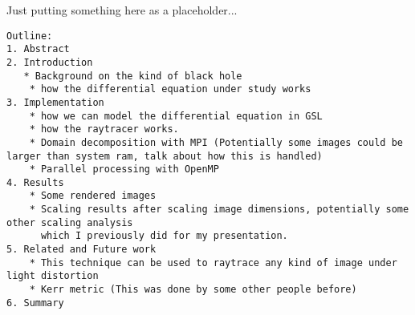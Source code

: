 Just putting something here as a placeholder...

\begin{verbatim}
Outline:
1. Abstract
2. Introduction
   * Background on the kind of black hole
    * how the differential equation under study works
3. Implementation
    * how we can model the differential equation in GSL
    * how the raytracer works.
    * Domain decomposition with MPI (Potentially some images could be larger than system ram, talk about how this is handled)
    * Parallel processing with OpenMP
4. Results
    * Some rendered images
    * Scaling results after scaling image dimensions, potentially some other scaling analysis 
      which I previously did for my presentation.
5. Related and Future work
    * This technique can be used to raytrace any kind of image under light distortion
    * Kerr metric (This was done by some other people before)
6. Summary

\end{verbatim}

